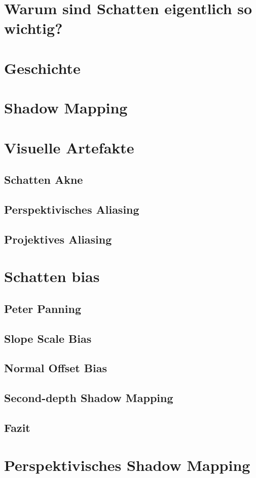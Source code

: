 

\chapter{Warum sind Schatten eigentlich so wichtig?}
\chapter{Geschichte}
\chapter{Shadow Mapping}
\chapter{Visuelle Artefakte}
\section{Schatten Akne}
\section{Perspektivisches Aliasing}
\section{Projektives Aliasing}
\chapter{Schatten bias}
\section{Peter Panning}
\section{Slope Scale Bias}
\section{Normal Offset Bias}
\section{Second-depth Shadow Mapping}
\section{Fazit}
\chapter{Perspektivisches Shadow Mapping}
